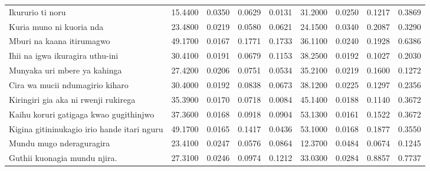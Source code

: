 \begin{table}
\begin{tabular}{lrrrrrrrr}
        Ikururio ti noru                                 & 15.4400                                 & 0.0350                                  & 0.0629 & 0.0131 & 31.2000   & 0.0250   & 0.1217 & 0.3869 \\
        Kuria muno ni kuoria nda                         & 23.4800                                 & 0.0219                                  & 0.0580 & 0.0621 & 24.1500   & 0.0340   & 0.2087 & 0.3290 \\
        Mburi na kaana itirumagwo                        & 49.1700                                 & 0.0167                                  & 0.1771 & 0.1733 & 36.1100   & 0.0240   & 0.1928 & 0.6386 \\
        Ihii na igwa ikuragira uthu-ini                  & 30.4100                                 & 0.0191                                  & 0.0679 & 0.1153 & 38.2500   & 0.0192   & 0.1027 & 0.2030 \\
        Munyaka uri mbere ya kahinga                     & 27.4200                                 & 0.0206                                  & 0.0751 & 0.0534 & 35.2100   & 0.0219   & 0.1600 & 0.1272 \\
        Cira wa mucii ndumagirio kiharo                  & 30.4000                                 & 0.0192                                  & 0.0838 & 0.0673 & 38.1200   & 0.0225   & 0.1297 & 0.2356 \\
        Kiringiri gia aka ni rwenji rukirega             & 35.3900                                 & 0.0170                                  & 0.0718 & 0.0084 & 45.1400   & 0.0188   & 0.1140 & 0.3672 \\
        Kaihu koruri gatigaga kwao gugithinjwo           & 37.3600                                 & 0.0168                                  & 0.0918 & 0.0904 & 53.1300   & 0.0161   & 0.1522 & 0.3672 \\
        Kigina gitininukagio irio hande itari nguru      & 49.1700                                 & 0.0165                                  & 0.1417 & 0.0436 & 53.1000   & 0.0168   & 0.1877 & 0.3550 \\
        Mundu mugo nderaguragira                         & 23.4100                                 & 0.0247                                  & 0.0576 & 0.0864 & 12.3700   & 0.0484   & 0.0674 & 0.1245 \\
        Guthii kuonagia mundu njira.                     & 27.3100                                 & 0.0246                                  & 0.0974 & 0.1212 & 33.0300   & 0.0284   & 0.8857 & 0.7737 \\

\end{tabular}
\end{table}
